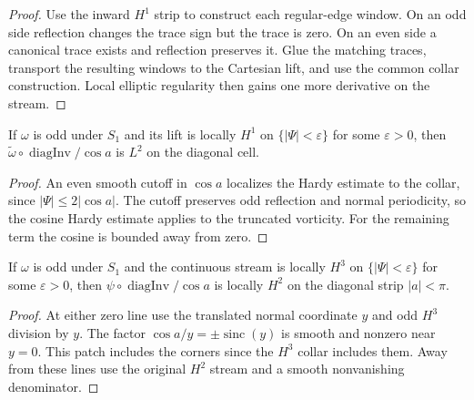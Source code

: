 \begin{proof}
\leanok
Use the inward $H^1$ strip to construct each regular-edge window.
On an odd side reflection changes the trace sign but the trace is zero.
On an even side a canonical trace exists and reflection preserves it.
Glue the matching traces, transport the resulting windows to the Cartesian
lift, and use the common collar construction. Local elliptic regularity
then gains one more derivative on the stream.
\end{proof}

\begin{lemma}
\label{lem:mixed-vorticity-division}
\leanok
If $\omega$ is odd under $S_1$ and its lift is locally $H^1$ on
$\{|\Psi|<\varepsilon\}$ for some $\varepsilon>0$, then
$\widetilde\omega\circ\operatorname{diagInv}/\cos a$ is $L^2$ on the diagonal
cell.
\end{lemma}

\begin{proof}
\leanok
An even smooth cutoff in $\cos a$ localizes the Hardy estimate to the
collar, since $|\Psi|\le 2|\cos a|$. The cutoff preserves odd reflection and
normal periodicity, so the cosine Hardy estimate applies to the truncated
vorticity. For the remaining term the cosine is bounded away from zero.
\end{proof}

\begin{lemma}
\label{lem:mixed-stream-division}
\leanok
If $\omega$ is odd under $S_1$ and the continuous stream is locally
$H^3$ on $\{|\Psi|<\varepsilon\}$ for some $\varepsilon>0$, then
$\psi\circ\operatorname{diagInv}/\cos a$ is locally $H^2$ on the diagonal
strip $|a|<\pi$.
\end{lemma}

\begin{proof}
\leanok
At either zero line use the translated normal coordinate $y$ and odd
$H^3$ division by $y$. The factor $\cos a/y=\pm\operatorname{sinc}(y)$
is smooth and nonzero near $y=0$. This patch includes the corners since
the $H^3$ collar includes them. Away from these lines use the original
$H^2$ stream and a smooth nonvanishing denominator.
\end{proof}

